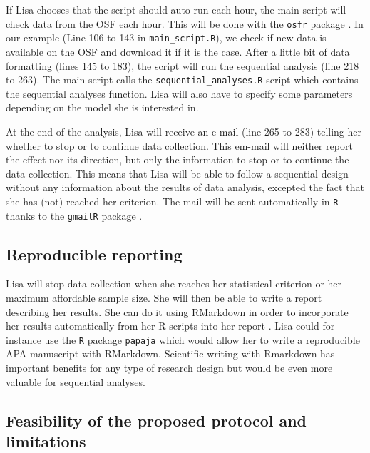 \documentclass[a4paper,jou,natbib,floatsintext,donotrepeattitle]{apa6}
\begin{document}
If Lisa chooses that the script should auto-run each hour, the main script will check data from the OSF each hour. This will be done with the \texttt{osfr} package \citep{wolen_osfr_2019}. In our example (Line 106 to 143 in \texttt{main\_script.R}), we check if new data is available on the OSF and download it if it is the case. 
After a little bit of data formatting (lines 145 to 183), the script will run the sequential analysis (line 218 to 263). The main script calls the \texttt{sequential\_analyses.R} script which contains the sequential analyses function. Lisa will also have to specify some parameters depending on the model she is interested in.

At the end of the analysis, Lisa will receive an e-mail (line 265 to 283) telling her whether to stop or to continue data collection. This em-mail will neither report the effect nor its direction, but only the information to stop or to continue the data collection. This means that Lisa will be able to follow a sequential design without any information about the results of data analysis, excepted the fact that she has (not) reached her criterion. The mail will be sent automatically in \texttt{R} thanks to the \texttt{gmailR} package \citep{hester_gmailr_2016}.

\subsection{Reproducible reporting}

Lisa will stop data collection when she reaches her statistical criterion or her maximum affordable sample size. She will then be able to write a report describing her results. She can do it using RMarkdown \citep{Allaire_rmarkdown_2019,Xie_RMarkdown_2018} in order to incorporate her results automatically from her R scripts into her report \citep[e.g., see][]{bauer_writing_2018}. Lisa could for instance use the \texttt{R} package \texttt{papaja} \citep{Aust_papaja_2018} which would allow her to write a reproducible APA manuscript with RMarkdown. Scientific writing with Rmarkdown has important benefits for any type of research design but would be even more valuable for sequential analyses.

\subsection{Feasibility of the proposed protocol and limitations}
\end{document}
